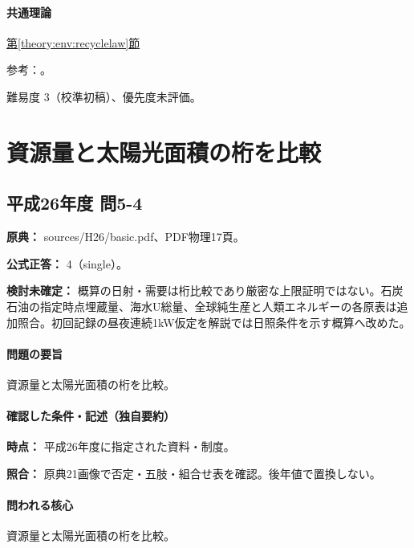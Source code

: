 \paragraph{共通理論} \hyperref[theory:env:recyclelaw]{第\ref*{theory:env:recyclelaw}節}

\par 参考：\cite{env_circular_law,env_appliance}。

\par 難易度 3（校準初稿）、優先度未評価。

\section{資源量と太陽光面積の桁を比較}

\subsection{平成26年度 問5-4}
\label{q:h26-reg-basic-5-4}

\noindent\textbf{原典：} sources/H26/basic.pdf、PDF物理17頁。

\textbf{公式正答：} 4（single）。

\par\textbf{検討未確定：} 概算の日射・需要は桁比較であり厳密な上限証明ではない。石炭石油の指定時点埋蔵量、海水U総量、全球純生産と人類エネルギーの各原表は追加照合。初回記録の昼夜連続1kW仮定を解説では日照条件を示す概算へ改めた。

\paragraph{問題の要旨} 資源量と太陽光面積の桁を比較。

\paragraph{確認した条件・記述（独自要約）}\mbox{}\par

\noindent\textbf{時点：} 平成26年度に指定された資料・制度。\par

\noindent\textbf{照合：} 原典21画像で否定・五肢・組合せ表を確認。後年値で置換しない。\par

\paragraph{問われる核心} 資源量と太陽光面積の桁を比較。

